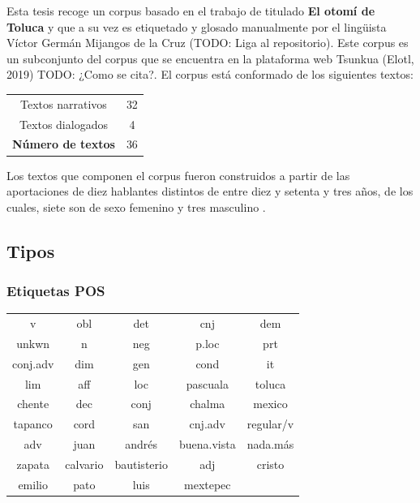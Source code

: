 \documentclass[letterpaper,12pt,oneside]{book}
\begin{document}
Esta tesis recoge un corpus basado en el trabajo de \citet{lastra1992otomi} titulado \textbf{El otomí de Toluca} y que a su vez es etiquetado y glosado manualmente por el lingüista Víctor Germán Mijangos de la Cruz (TODO: Liga al repositorio). Este corpus es un subconjunto del corpus que se encuentra en la plataforma web Tsunkua (Elotl, 2019) TODO: ¿Como se cita?. El corpus está conformado de los siguientes textos:

\begin{center}
	\begin{tabular}{ c | c }
		Textos narrativos & 32 \\
		Textos dialogados & 4  \\ \hline
		\textbf{Número de textos}  & 36 \\
	\end{tabular}
\end{center}

Los textos que componen el corpus fueron construidos a partir de las aportaciones de diez hablantes distintos de entre diez y setenta y tres años, de los cuales, siete son de sexo femenino y tres masculino \citep{lastra1992otomi}. 


\subsection{Tipos}

\subsubsection{Etiquetas POS}

\begin{center}
	\begin{tabular}{| c | c | c | c | c |}
		\hline
		v & obl & det & cnj & dem \\ 
		unkwn & n & neg & p.loc & prt \\
		conj.adv & dim & gen & cond & it \\
	    lim & aff & loc & pascuala & toluca \\
	    chente & dec & conj & chalma & mexico \\
	    tapanco & cord & san & cnj.adv & regular/v \\
	    adv & juan & andrés & buena.vista & nada.más \\
	    zapata & calvario & bautisterio & adj & cristo \\
	    emilio & pato & luis & mextepec & \\
	    \hline
	\end{tabular}
\end{center}
\end{document}
